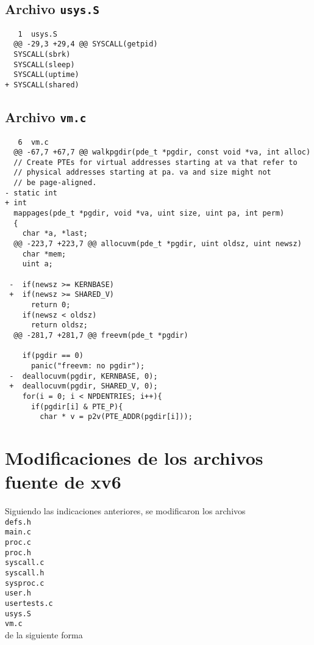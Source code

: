 \documentclass[12pt]{article}
\begin{document}
\subsection{Archivo {\tt usys.S}}
\begin{verbatim}
   1  usys.S 
  @@ -29,3 +29,4 @@ SYSCALL(getpid)
  SYSCALL(sbrk)
  SYSCALL(sleep)
  SYSCALL(uptime)
+ SYSCALL(shared)
\end{verbatim}
\subsection{Archivo {\tt vm.c}}
\begin{verbatim}
   6  vm.c 
  @@ -67,7 +67,7 @@ walkpgdir(pde_t *pgdir, const void *va, int alloc)
  // Create PTEs for virtual addresses starting at va that refer to
  // physical addresses starting at pa. va and size might not
  // be page-aligned.
- static int
+ int
  mappages(pde_t *pgdir, void *va, uint size, uint pa, int perm)
  {
    char *a, *last;
  @@ -223,7 +223,7 @@ allocuvm(pde_t *pgdir, uint oldsz, uint newsz)
    char *mem;
    uint a;
  
 -  if(newsz >= KERNBASE)
 +  if(newsz >= SHARED_V)
      return 0;
    if(newsz < oldsz)
      return oldsz;
  @@ -281,7 +281,7 @@ freevm(pde_t *pgdir)
  
    if(pgdir == 0)
      panic("freevm: no pgdir");
 -  deallocuvm(pgdir, KERNBASE, 0);
 +  deallocuvm(pgdir, SHARED_V, 0);
    for(i = 0; i < NPDENTRIES; i++){
      if(pgdir[i] & PTE_P){
        char * v = p2v(PTE_ADDR(pgdir[i]));

\end{verbatim}
\section{Modif\/icaciones de los archivos fuente de xv6}
Siguiendo las indicaciones anteriores, se modif\/icaron los archivos\\
{\tt defs.h}\\
{\tt main.c}\\
{\tt proc.c}\\
{\tt proc.h}\\
{\tt syscall.c}\\
{\tt syscall.h}\\
{\tt sysproc.c}\\
{\tt user.h}\\
{\tt usertests.c}\\
{\tt usys.S}\\
{\tt vm.c}\\
de la siguiente forma
\end{document}
